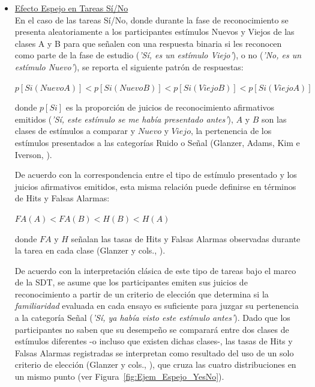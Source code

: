 \begin{itemize}
\item \underline{Efecto Espejo en Tareas Sí/No}\\

En el caso de las tareas Sí/No, donde durante la fase de reconocimiento se presenta aleatoriamente a los participantes estímulos Nuevos y Viejos de las clases A y B para que señalen con una respuesta binaria si les reconocen como parte de la fase de estudio (\textit{'Sí, es un estímulo Viejo'}), o no (\textit{'No, es un estímulo Nuevo'}), se reporta el siguiente patrón de respuestas:\\

\begin{center}
$p[Si(NuevoA)] < p[Si(NuevoB)] < p[Si(ViejoB)] < p[Si(ViejoA)]$\\
\end{center}
\begin{center}
donde $p[Si]$ es la proporción de juicios de reconocimiento afirmativos emitidos (\textit{'Sí, este estímulo se me había presentado antes'}), $A$ y $B$ son las clases de estímulos a comparar y $Nuevo$ y $Viejo$, la pertenencia de los estímulos presentados a las categorías Ruido o Señal (Glanzer, Adams, Kim e Iverson, \citeyear{Glanzer1993}).\\
\end{center}

De acuerdo con la correspondencia entre el tipo de estímulo presentado y los juicios afirmativos emitidos, esta misma relación puede definirse en términos de Hits y Falsas Alarmas:\\

\begin{center}
$FA(A) < FA(B) < H(B) < H(A)$\\
\end{center}
\begin{center}
donde $FA$ y $H$ señalan las tasas de Hits y Falsas Alarmas observadas durante la tarea en cada clase (Glanzer y cols., \citeyear{Glanzer1993}).\\
\end{center}

De acuerdo con la interpretación clásica de este tipo de tareas bajo el marco de la SDT, se asume que los participantes emiten sus juicios de reconocimiento a partir de un criterio de elección que determina si la \textit{familiaridad} evaluada en cada ensayo es suficiente para juzgar su pertenencia a la categoría Señal (\textit{'Sí, ya había visto este estímulo antes'}). Dado que los participantes no saben que su desempeño se comparará entre dos clases de estímulos diferentes -o incluso que existen dichas clases-, las tasas de Hits y Falsas Alarmas registradas se interpretan como resultado del uso de un solo criterio de elección (Glanzer y cols., \citeyear{Glanzer1993}), que cruza las cuatro distribuciones en un mismo punto (ver Figura~\ref{fig:Ejem_Espejo_YesNo}).\\


\end{itemize}
